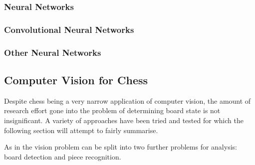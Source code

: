 \subsubsection{Neural Networks}
\subsubsection{Convolutional Neural Networks}
\subsubsection{Other Neural Networks}


\subsection{Computer Vision for Chess}
Despite chess being a very narrow application of computer vision, the amount of research effort gone into the problem of determining 
board state is not insignificant. 
A variety of approaches have been tried and tested for which the following section will attempt to fairly summarise.

As in \cite{Ding2016ChessVisionC} the vision problem can be split into two further problems for analysis: board detection and piece recognition.

